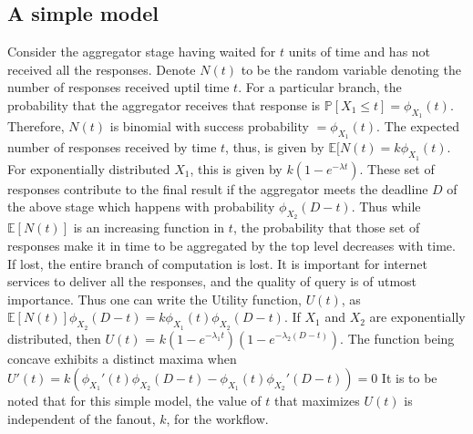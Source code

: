 \documentclass[letterpaper,twocolumn,10pt]{article}
\begin{document}
\subsection{A simple model}
Consider the aggregator stage having waited for $t$ units of time and has not received all the responses.
Denote $N(t)$ to be the random variable denoting the number of responses received uptil time $t$. 
For a particular branch, the probability that the aggregator receives that response is
$\mathbb{P}[X_1 \leq t] = \phi_{X_1}(t)$.
Therefore, $N(t)$ is binomial with success probability $ = \phi_{X_1}(t)$. 
The expected number of responses received by time $t$, thus, is given by $\mathbb{E}[N(t) = k\phi_{X_1}(t)$.
For exponentially distributed $X_1$, this is given by $k(1 - e^{-\lambda t})$. 
These set of responses contribute to the final result if the aggregator meets the deadline $D$ of the above stage which happens with probability $\phi_{X_2}(D - t)$. 
Thus while $\mathbb{E}[N(t)]$ is an increasing function in $t$, the probability that those set of responses make it in time to be aggregated by the top level decreases with time.
If lost, the entire branch of computation is lost. It is important for internet services to deliver all the responses, and the quality of query is of utmost importance. 
Thus one can write the Utility function, $U(t)$, as $\mathbb{E}[N(t)]\phi_{X_2}(D - t) = k\phi_{X_1}(t)\phi_{X_2}(D - t)$. 
If $X_1$ and $X_2$ are exponentially distributed, then $U(t)$ = $k(1 - e^{-\lambda_1 t})(1 - e^{-\lambda_2(D - t)})$.
The function being concave exhibits a distinct maxima when $U'(t) = k\left(\phi_{X_1}'(t)\phi_{X_2}(D - t) - \phi_{X_1}(t)\phi_{X_2}'(D - t)\right) = 0$
It is to be noted that for this simple model, the value of $t$ that maximizes $U(t)$ is independent of the fanout, $k$, for the workflow.
\end{document}
